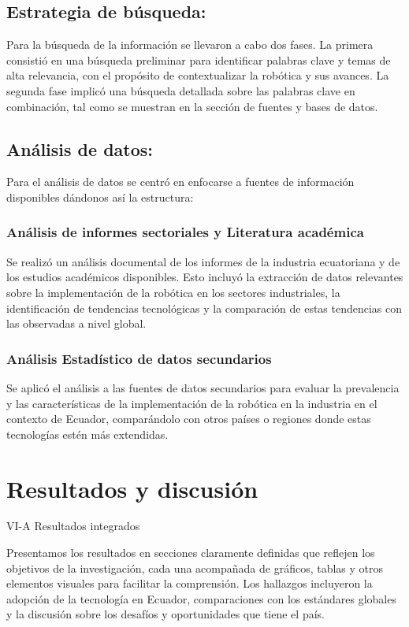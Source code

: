 \documentclass[conference]{IEEEtran}
\begin{document}
\subsection{Estrategia de búsqueda:}

Para la búsqueda de la información se llevaron a cabo dos fases. La primera consistió en una búsqueda preliminar para identificar palabras clave y temas de alta relevancia, con el propósito de contextualizar la robótica y sus avances. La segunda fase implicó una búsqueda detallada sobre las palabras clave en combinación, tal como se muestran en la sección de fuentes y bases de datos.

\subsection{Análisis de datos:}

Para el análisis de datos se centró en enfocarse a fuentes de información disponibles dándonos así la estructura:


\subsubsection{Análisis de informes sectoriales y Literatura académica}

Se realizó un análisis documental de los informes de la industria ecuatoriana y de los estudios académicos disponibles. Esto incluyó la extracción de datos relevantes sobre la implementación de la robótica en los sectores industriales, la identificación de tendencias tecnológicas y la comparación de estas tendencias con las observadas a nivel global.

\subsubsection{Análisis Estadístico de datos secundarios}

Se aplicó el análisis a las fuentes de datos secundarios para evaluar la prevalencia y las características de la implementación de la robótica en la industria en el contexto de Ecuador, comparándolo con otros países o regiones donde estas tecnologías estén más extendidas.

\section{Resultados y discusión}

VI-A Resultados integrados

Presentamos los resultados en secciones claramente definidas que reflejen los objetivos de la investigación, cada una acompañada de gráficos, tablas y otros elementos visuales para facilitar la comprensión. Los hallazgos incluyeron la adopción de la tecnología en Ecuador, comparaciones con los estándares globales y la discusión sobre los desafíos y oportunidades que tiene el país.
\end{document}

